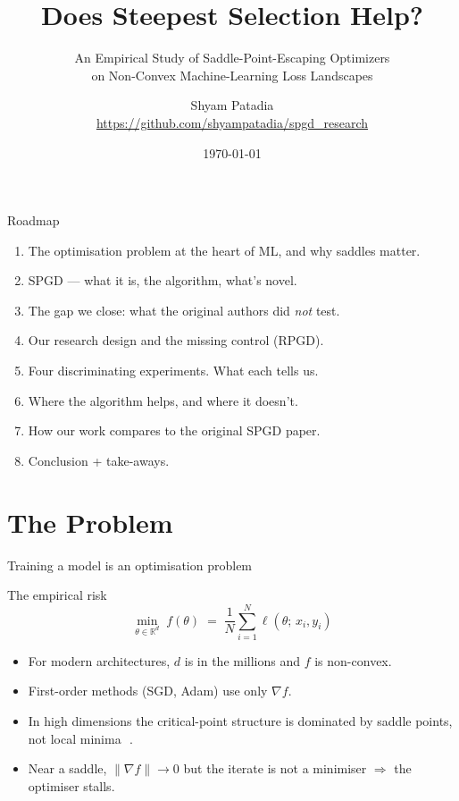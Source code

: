 \documentclass[11pt,aspectratio=169]{beamer}
\title[SPGD on ML Loss Landscapes]{Does Steepest Selection Help?}
\subtitle{An Empirical Study of Saddle-Point-Escaping Optimizers \\
          on Non-Convex Machine-Learning Loss Landscapes}
\author[S. Patadia]{Shyam Patadia \\
  {\footnotesize\url{https://github.com/shyampatadia/spgd_research}}}
\institute[WPI]{Worcester Polytechnic Institute \\ MA 551 Computational Statistics}
\date{\today}
\newcommand{\R}{\mathbb{R}}
\begin{document}
\begin{frame}[plain]
  \titlepage
\end{frame}

\begin{frame}{Roadmap}
  \begin{enumerate}\setlength\itemsep{0.35em}
    \item The optimisation problem at the heart of ML, and why saddles matter.
    \item \alert{SPGD} --- what it is, the algorithm, what's novel.
    \item The \alert{gap} we close: what the original authors did \emph{not} test.
    \item Our research design and the missing control (\alert{RPGD}).
    \item Four discriminating experiments. What each tells us.
    \item Where the algorithm helps, and where it doesn't.
    \item How our work compares to the original SPGD paper.
    \item Conclusion + take-aways.
  \end{enumerate}
\end{frame}


\section{The Problem}

\begin{frame}{Training a model is an optimisation problem}
  \begin{block}{The empirical risk}
    \[
      \min_{\theta \in \R^d}\;
      f(\theta) \;=\; \frac{1}{N}\sum_{i=1}^{N} \ell\!\left(\theta;\, x_i, y_i\right)
    \]
  \end{block}
  \vspace{0.3em}
  \begin{itemize}\setlength\itemsep{0.4em}
    \item For modern architectures, \(d\) is in the millions and \(f\) is non-convex.
    \item First-order methods (SGD, Adam) use only \(\nabla f\).
    \item In high dimensions the critical-point structure is dominated by
          \alert{saddle points}, not local minima
          \,\,\scriptsize{\citep{dauphin2014saddle, choromanska2015loss}}.
    \item Near a saddle, \(\|\nabla f\|\!\to\!0\) but the iterate is not a minimiser
          \(\Rightarrow\) the optimiser \alert{stalls}.
  \end{itemize}
\end{frame}
\end{document}
